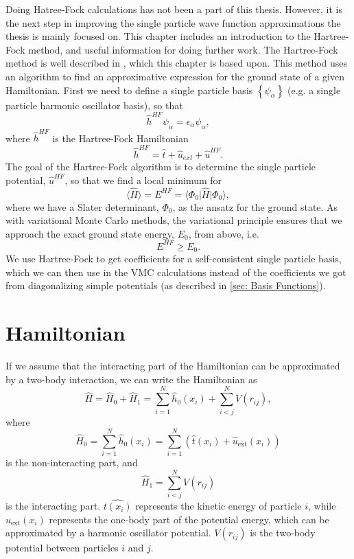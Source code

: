 \documentclass[../main.tex]{subfiles}
\begin{document}
Doing Hatree-Fock calculations has not been a part of this thesis. However, it is the next step in improving the single particle wave function approximations the thesis is mainly focused on. This chapter includes an introduction to the Hartree-Fock method, and useful information for doing further work. The Hartree-Fock method is well described in \cite{basicMB}, which this chapter is based upon. This method uses an algorithm to find an approximative expression for the ground state of a given Hamiltonian. First we need to define a single particle basis $\left\{\psi_\alpha\right\}$ (e.g. a single particle harmonic oscillator basis), so that 
\begin{equation}
    \hat{h}^{HF}\psi_\alpha = \epsilon_\alpha \psi_\alpha,
\end{equation}
where $\hat{h}^{HF}$ is the Hartree-Fock Hamiltonian
\begin{equation}
    \hat{h}^{HF} = \hat{t} + \hat{u}_{ext} + \hat{u}^{HF}.
\end{equation}
The goal of the Hartree-Fock algorithm is to determine the single particle potential, $\hat{u}^{HF}$, so that we find a local minimum for
\begin{equation}
    \langle \hat{H} \rangle = E^{HF} = \langle \Phi_0 \vert \hat{H} \vert \Phi_0 \rangle,
\end{equation}
where we have a Slater determinant, $\Phi_0$, as the ansatz for the ground state. As with variational Monte Carlo methods, the variational principle ensures that we approach the exact ground state energy, $E_0$, from above, i.e.
\begin{equation}
    E^{HF} \geq E_0.
\end{equation}
We use Hartree-Fock to get coefficients for a self-consistent single particle basis, which we can then use in the VMC calculations instead of the coefficients we got from diagonalizing simple potentials (as described in \ref{sec: Basis Functions}).

\section{Hamiltonian}

If we assume that the interacting part of the Hamiltonian can be approximated by a two-body interaction, we can write the Hamiltonian as
\begin{equation}
    \hat{H} = \hat{H}_0 + \hat{H}_1 = \sum_{i=1}^N \hat{h}_0(x_i) + \sum_{i<j}^N V(r_{ij}),
\end{equation}
where
\begin{equation}
    \hat{H}_0 = \sum_{i=1}^N \hat{h}_0(x_i) = \sum_{i=1}^N \left( \hat{t}(x_i) + \hat{u}_{\textrm{ext}}(x_i) \right)
\end{equation}
is the non-interacting part, and
\begin{equation}
    \hat{H}_1 = \sum_{i<j}^N V(r_{ij})
\end{equation}
is the interacting part. $\hat{t(x_i)}$ represents the kinetic energy of particle $i$, while $\hat{u}_{\textrm{ext}}(x_i)$ represents the one-body part of the potential energy, which can be approximated by a harmonic oscillator potential. $V(r_{ij})$ is the two-body potential between particles $i$ and $j$.
\end{document}
